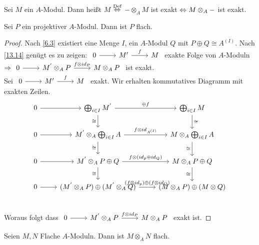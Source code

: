 \begin{df}
	Sei $M$ ein $A$-Modul. Dann heißt $M$   $\overset{\text{Def}}{\Leftrightarrow}$ $-\otimes_A M$ ist exakt $\Leftrightarrow M \otimes_A -$ ist exakt.
\end{df} 
\begin{bem} \label{13.18}
	Sei $P$ ein projektiver $A$-Modul. Dann ist $P$ flach. 
\end{bem}
\begin{proof}
	Nach \ref{6.3} existiert eine Menge $I$, ein $A$-Modul $Q$ mit $ P \oplus Q \cong A^{(I)}$. Nach \ref{13.14} genügt es zu zeigen: $\begin{tikzcd}
	0 \arrow{r} & M' \arrow{r}{f} & M \end{tikzcd}$ exakte Folge von $A$-Moduln $\Ra \begin{tikzcd}
	0 \arrow{r} & M^{'}\otimes_A P \arrow{r}{f \otimes id_P} & M \otimes_A P \end{tikzcd}$ ist exakt. \\
	Sei $\begin{tikzcd} 0 \arrow{r} & M' \arrow{r}{f} & M \end{tikzcd}$ exakt. Wir erhalten kommutatives Diagramm mit exakten Zeilen.
		$$\begin{tikzcd}
	0 \arrow{r} & \bigoplus_{i \in I} M^{'} \arrow[swap]{d}{\cong}\arrow{r}{\oplus f}& \bigoplus_{i \in I} M \arrow{d}{\cong} \\
	0 \arrow{r} & M^{'} \otimes_A \bigoplus_{i \in I} A \arrow[swap]{d}{\cong} \arrow{r}{ f \otimes id_{A^{(I)}}} & 	M \otimes_A \bigoplus_{i \in I} A \arrow[swap]{d}{\cong} \\
	0 \arrow{r} & M^{'} \otimes_A P \oplus Q \arrow[swap]{d}{\cong} \arrow{r}{ f \otimes (id_p \oplus id_Q) } & 	M \otimes_A P \oplus Q \arrow[swap]{d}{\cong}\\
	0 \arrow{r} & (M^{'} \otimes_A P) \oplus ( M^{'} \otimes_A Q) \arrow{r}{ (f \otimes id_p) \oplus (f \otimes id_Q) } & 	(M \otimes_A P) \oplus (M \otimes Q) \\
	\end{tikzcd}$$
	Woraus folgt dass $\begin{tikzcd}
	0 \arrow{r} & M^{'}\otimes_A P \arrow{r}{f \otimes id_P} & M \otimes_A P \end{tikzcd}$ exakt ist.
\end{proof}
\begin{bem} \label{13.19}
	Seien $M,N $ Flache $A$-Moduln. Dann ist $ M \otimes_A N $ flach.
\end{bem}
